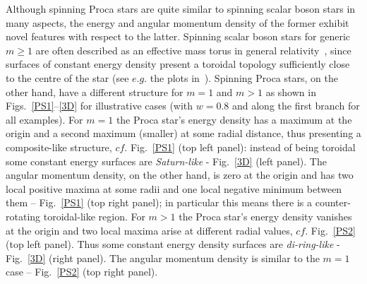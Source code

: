 \documentclass{article}
\numberwithin{equation}{section}
\begin{document}
Although spinning Proca stars are quite similar to spinning scalar boson stars in many aspects, the energy and angular momentum density of the former exhibit novel features with respect to the latter. Spinning scalar boson stars for generic $m\geqslant 1$ are often described as an effective mass torus in general relativity~\cite{Schunck:1996he}, since surfaces of constant energy density present a toroidal topology sufficiently close to the centre of the star (see $e.g.$ the plots in~\cite{Herdeiro:2014ima}).  Spinning Proca stars, on the other hand, have a different structure for $m=1$ and $m>1$ as shown in Figs.~\ref{PS1}--\ref{3D} for illustrative cases (with $w=0.8$ and along the first branch for all examples). For $m=1$ the Proca star's energy density has a maximum at the origin and a second maximum (smaller) at some radial distance, thus presenting a composite-like structure, $cf.$ Fig.~\ref{PS1} (top left panel): instead of being toroidal some constant energy surfaces are \textit{Saturn-like} - Fig.~\ref{3D} (left panel). The angular momentum density, on the other hand, is zero at the origin and has two local positive maxima at some radii and one local negative minimum between them -- Fig.~\ref{PS1} (top right panel); in particular this means there is a counter-rotating toroidal-like region. For $m>1$ the Proca star's energy density vanishes at the origin and two local maxima arise at different radial values, $cf.$ Fig.~\ref{PS2} (top left panel). Thus some constant energy density surfaces are \textit{di-ring-like} - Fig.~\ref{3D} (right panel). The angular momentum density is similar to the $m=1$ case -- Fig.~\ref{PS2} (top right panel).
\end{document}
